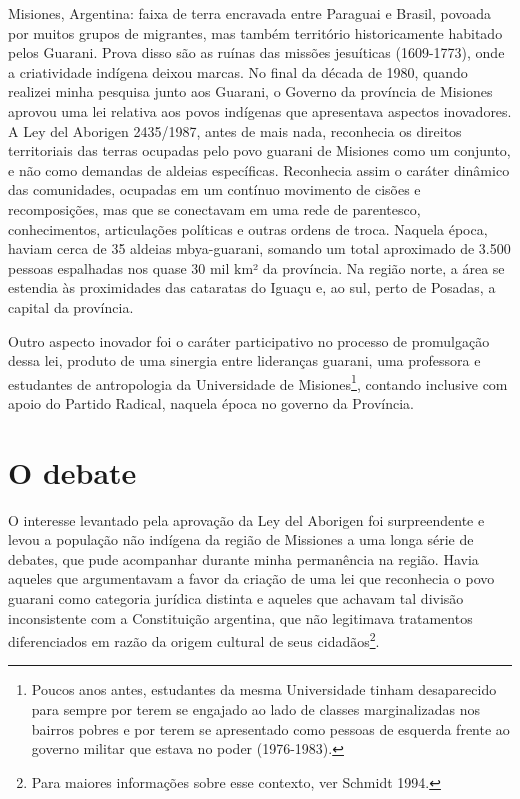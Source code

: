 {{Misiones, Argentina: faixa de terra encravada entre Paraguai e Brasil,
povoada por muitos grupos de migrantes, mas também território
historicamente habitado pelos Guarani. Prova disso são as ruínas das
missões jesuíticas (1609-1773), onde a criatividade indígena deixou
marcas. No final da década de 1980, quando realizei minha pesquisa
junto aos Guarani, o Governo da província de Misiones aprovou uma lei
relativa aos povos indígenas que apresentava aspectos inovadores. A Ley
del Aborigen 2435/1987, antes de mais nada, reconhecia os direitos
territoriais das terras ocupadas pelo povo guarani de Misiones como um
conjunto, e não como demandas de aldeias específicas. Reconhecia assim
o caráter dinâmico das comunidades, ocupadas em um contínuo movimento
de cisões e recomposições, mas que se conectavam em uma rede de
parentesco, conhecimentos, articulações políticas e outras ordens de
troca. Naquela época, haviam cerca de 35 aldeias mbya-guarani, somando
um total aproximado de 3.500 pessoas espalhadas nos quase 30 mil km² da
província. Na região norte, a área se estendia às proximidades das
cataratas do Iguaçu e, ao sul, perto de Posadas, a capital da
província.

Outro aspecto inovador foi o caráter participativo no processo de
promulgação dessa lei, produto de uma sinergia entre lideranças
guarani, uma professora e estudantes de antropologia da Universidade de
Misiones\footnote{Poucos anos antes, estudantes da mesma Universidade
tinham desaparecido para sempre por terem se engajado ao lado de
classes marginalizadas nos bairros pobres e por terem se apresentado
como pessoas de esquerda frente ao governo militar que estava no poder
(1976-1983).}, contando inclusive com apoio do Partido Radical, naquela
época no governo da Província. 

\section{O debate}

O interesse levantado pela aprovação da Ley del Aborigen foi
surpreendente e levou a população não indígena da região de Missiones a
uma longa série de debates, que pude acompanhar durante minha
permanência na região. Havia aqueles que argumentavam a favor da
criação de uma lei que reconhecia o povo guarani como categoria
jurídica distinta e aqueles que achavam tal divisão inconsistente com a
Constituição argentina, que não legitimava tratamentos diferenciados em
razão da origem cultural de seus cidadãos\footnote{Para maiores
informações sobre esse contexto, ver Schmidt 1994.}. 

}}
